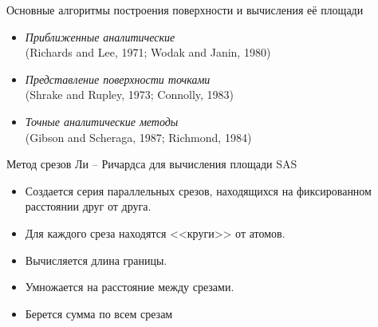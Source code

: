 \documentclass{beamer}
\begin{document}
    \begin{frame}{Основные алгоритмы построения поверхности и вычисления её площади}
        \begin{itemize}
        \item \emph{Приближенные аналитические} \\
            (Richards and Lee, 1971; Wodak and Janin, 1980)
        \item \emph{Представление поверхности точками} \\
            (Shrake and Rupley, 1973; Connolly, 1983)
        \item \emph{Точные аналитические методы} \\
            (Gibson and Scheraga, 1987;  Richmond, 1984)
        \end{itemize}
    \end{frame}

    \begin{frame}{Метод срезов Ли -- Ричардса
        для вычисления площади SAS}
        \begin{itemize}
        \item Создается серия параллельных срезов,
            находящихся на фиксированном расстоянии друг от друга.
        \item Для каждого среза находятся <<круги>> от атомов.
        \item Вычисляется длина границы.
        \item Умножается на расстояние между срезами.
        \item Берется сумма по всем срезам
        \end{itemize}
    \end{frame}
\end{document}
